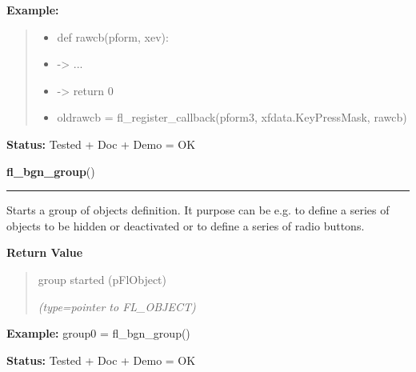\begin{boxedminipage}{\funcwidth}
\textbf{Example:}
\begin{quote}
  \begin{itemize}

  \item
    \setlength{\parskip}{0.6ex}
def rawcb(pform, xev):



  \item {\textbar}-{\textgreater}{\textbar} ...



  \item {\textbar}-{\textgreater}{\textbar} return 0



  \item oldrawcb = fl\_register\_callback(pform3, xfdata.KeyPressMask, rawcb)



\end{itemize}

\end{quote}

\textbf{Status:} Tested + Doc + Demo = OK



    \end{boxedminipage}

    \label{xformslib:flbasic:fl_bgn_group}

    \vspace{0.5ex}

\hspace{.8\funcindent}\begin{boxedminipage}{\funcwidth}

    \raggedright \textbf{fl\_bgn\_group}()

    \vspace{-1.5ex}

    \rule{\textwidth}{0.5\fboxrule}
\setlength{\parskip}{2ex}
    Starts a group of objects definition. It purpose can be e.g. to define 
    a series of objects to be hidden or deactivated or to define a series 
    of radio buttons.

\setlength{\parskip}{1ex}
      \textbf{Return Value}
    \vspace{-1ex}

      \begin{quote}
      group started (pFlObject)

      {\it (type=pointer to FL\_OBJECT)}

      \end{quote}

\textbf{Example:} group0 = fl\_bgn\_group()



\textbf{Status:} Tested + Doc + Demo = OK



    \end{boxedminipage}

